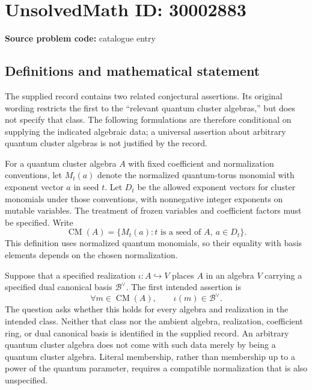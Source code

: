 \documentclass[11pt]{article}
\begin{document}
\section*{UnsolvedMath ID: 30002883}
\textbf{Source problem code:} catalogue entry
\subsection{Definitions and mathematical statement}
The supplied record contains two related conjectural assertions. Its original wording restricts the first to the ``relevant quantum cluster algebras,'' but does not specify that class. The following formulations are therefore conditional on supplying the indicated algebraic data; a universal assertion about arbitrary quantum cluster algebras is not justified by the record.

For a quantum cluster algebra \(A\) with fixed coefficient and normalization conventions, let \(M_t(a)\) denote the normalized quantum-torus monomial with exponent vector \(a\) in seed \(t\). Let \(D_t\) be the allowed exponent vectors for cluster monomials under those conventions, with nonnegative integer exponents on mutable variables. The treatment of frozen variables and coefficient factors must be specified. Write
\[
\operatorname{CM}(A)=\{M_t(a): t\text{ is a seed of }A,\ a\in D_t\}.
\]
This definition uses normalized quantum monomials, so their equality with basis elements depends on the chosen normalization.

Suppose that a specified realization \(\iota:A\hookrightarrow V\) places \(A\) in an algebra \(V\) carrying a specified dual canonical basis \(\mathcal B^{\vee}\). The first intended assertion is
\[
\forall m\in\operatorname{CM}(A),\qquad
\iota(m)\in\mathcal B^{\vee}.
\]
The question asks whether this holds for every algebra and realization in the intended class. Neither that class nor the ambient algebra, realization, coefficient ring, or dual canonical basis is identified in the supplied record. An arbitrary quantum cluster algebra does not come with such data merely by being a quantum cluster algebra. Literal membership, rather than membership up to a power of the quantum parameter, requires a compatible normalization that is also unspecified.
\end{document}
